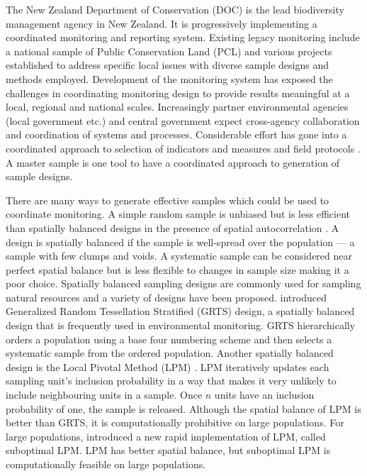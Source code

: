 \documentclass[titlepage]{article}
\begin{document}
The New Zealand Department of Conservation (DOC) is the lead biodiversity management agency in New Zealand. It is progressively implementing a coordinated monitoring and reporting system. Existing legacy monitoring include a national sample of Public Conservation Land (PCL) and various projects established to address specific local issues with diverse sample designs and methods employed. Development of the monitoring system has exposed the challenges in coordinating monitoring design to provide results meaningful at a local, regional and national scales. Increasingly partner environmental agencies (local government etc.) and central government expect cross-agency collaboration and coordination of systems and processes. Considerable effort has gone into a coordinated approach to selection of indicators and measures and field protocols \cite{DOC}. A master sample is one tool to have a coordinated approach to generation of sample designs.  

There are many ways to generate effective samples which could be used to coordinate monitoring. A simple random sample is unbiased but is less efficient than spatially balanced designs in the presence of spatial autocorrelation \citep{Grafstrom2013}. A design is spatially balanced if the sample is well-spread over the population --- a sample with few clumps and voids. A systematic sample can be considered near perfect spatial balance but is less flexible to changes in sample size making it a poor choice. Spatially balanced sampling designs are commonly used for sampling natural resources and a variety of designs have been proposed. \cite{StevensOlsen2004} introduced Generalized Random Tessellation Stratified (GRTS) design, a spatially balanced design that is frequently used in environmental monitoring. GRTS hierarchically orders a population using a base four numbering scheme and then selects a systematic sample from the ordered population. Another spatially balanced design is the Local Pivotal Method (LPM) \citep{Grafstrom2012}. LPM iteratively updates each sampling unit's inclusion probability in a way that makes it very unlikely to include neighbouring units in a sample. Once $n$ units have an inclusion probability of one, the sample is released. Although the spatial balance of LPM is better than GRTS, it is computationally prohibitive on large populations. For large populations, \cite{Grafstrom2014} introduced a new rapid implementation of LPM, called suboptimal LPM. LPM has better spatial balance, but suboptimal LPM is computationally feasible on large populations.
\end{document}
